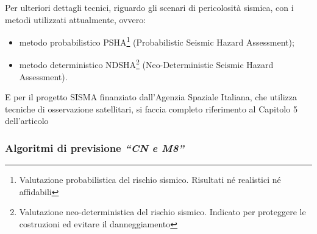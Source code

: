 Per ulteriori dettagli tecnici, riguardo gli scenari di pericolosit\`a sismica, con i metodi utilizzati attualmente, ovvero:
\begin{itemize}
    \item metodo probabilistico PSHA\footnote{Valutazione probabilistica del rischio sismico. Risultati n\'e realistici n\'e affidabili} (Probabilistic Seismic Hazard Assessment);
    \item metodo deterministico NDSHA\footnote{ Valutazione neo-deterministica del rischio sismico. Indicato per proteggere le costruzioni ed evitare il danneggiamento } (Neo-Deterministic Seismic Hazard Assessment).
\end{itemize}
E per il progetto SISMA finanziato dall'Agenzia Spaziale Italiana, che utilizza tecniche di osservazione satellitari, si faccia completo riferimento al Capitolo 5 dell'articolo \cite{GiulianoFPanza}

\subsubsection{Algoritmi di previsione \textit{``CN e M8''}}

